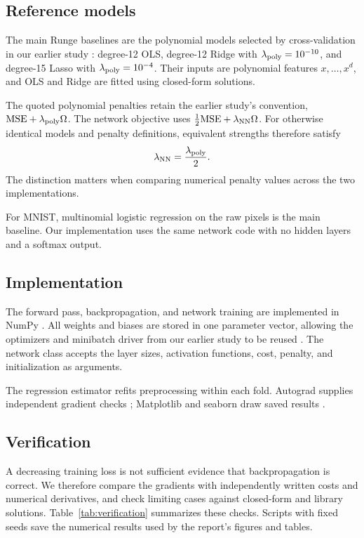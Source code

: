 \documentclass[aps,prb,reprint,superscriptaddress,nofootinbib,longbibliography,floatfix]{revtex4-2}
\newcommand{\MSE}{\mathrm{MSE}}
\begin{document}
\subsection{Reference models}\label{sec:benchmarks}
The main Runge baselines are the polynomial models selected by cross-validation in our earlier study \cite{Ozdber2026}: degree-12 OLS, degree-12 Ridge with $\lambda_{\rm poly}=10^{-10}$, and degree-15 Lasso with $\lambda_{\rm poly}=10^{-4}$. Their inputs are polynomial features $x,\ldots,x^d$, and OLS and Ridge are fitted using closed-form solutions.

The quoted polynomial penalties retain the earlier study's convention,
$\MSE+\lambda_{\rm poly}\Omega$. The network objective uses
$\frac12\MSE+\lambda_{\rm NN}\Omega$. For otherwise identical models and penalty definitions, equivalent strengths therefore satisfy
\[
\lambda_{\rm NN}=\frac{\lambda_{\rm poly}}{2}.
\]
The distinction matters when comparing numerical penalty values across the two implementations.

For MNIST, multinomial logistic regression on the raw pixels is the main baseline. Our implementation uses the same network code with no hidden layers and a softmax output.

\subsection{Implementation}\label{sec:implementation}
The forward pass, backpropagation, and network training are implemented in NumPy \cite{Harris2020}. All weights and biases are stored in one parameter vector, allowing the optimizers and minibatch driver from our earlier study to be reused \cite{Ozdber2026}. The network class accepts the layer sizes, activation functions, cost, penalty, and initialization as arguments.

The regression estimator refits preprocessing within each fold. Autograd supplies independent gradient checks \cite{Maclaurin2015}; Matplotlib and seaborn draw saved results \cite{Hunter2007,Waskom2021}.

\subsection{Verification}\label{sec:verification}
A decreasing training loss is not sufficient evidence that backpropagation is correct. We therefore compare the gradients with independently written costs and numerical derivatives, and check limiting cases against closed-form and library solutions. Table~\ref{tab:verification} summarizes these checks. Scripts with fixed seeds save the numerical results used by the report's figures and tables.
\end{document}
